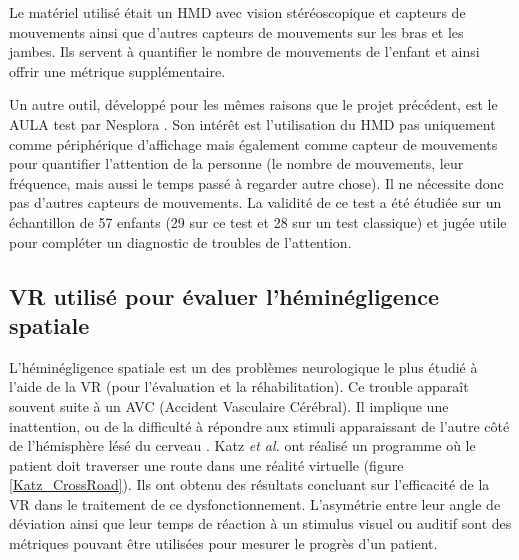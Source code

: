 		\begin{minipage}{\linewidth}
			\label{Rizzo_VirtualClassroom}
		\end{minipage}\medskip

		Le matériel utilisé était un HMD avec vision stéréoscopique et capteurs de mouvements ainsi que d'autres capteurs de mouvements sur les bras et les jambes. Ils servent à quantifier le nombre de mouvements de l'enfant et ainsi offrir une métrique supplémentaire.
		
		Un autre outil, développé pour les mêmes raisons que le projet précédent, est le AULA test par Nesplora \cite{Diaz_AulaVRTest}. 
		Son intérêt est l'utilisation du HMD pas uniquement comme périphérique d'affichage mais également comme capteur de mouvements pour quantifier l'attention de la personne (le nombre de mouvements, leur fréquence, mais aussi le temps passé à regarder autre chose). Il ne nécessite donc pas d'autres capteurs de mouvements. La validité de ce test a été étudiée sur un échantillon de 57 enfants (29 sur ce test et 28 sur un test classique) et jugée utile pour compléter un diagnostic de troubles de l'attention.

	\subsection*{VR utilisé pour évaluer l'héminégligence spatiale}

		L'héminégligence spatiale est un des problèmes neurologique le plus étudié à l'aide de la VR (pour l'évaluation et la réhabilitation). Ce trouble apparaît souvent suite à un AVC (Accident Vasculaire Cérébral). Il implique une inattention, ou de la difficulté à répondre aux stimuli apparaissant de l'autre côté de l'hémisphère lésé du cerveau \cite{VARSG4HC1}.
		Katz \textit{et al.} \cite{Katz_CrossStreet} ont réalisé un programme où le patient doit traverser une route dans une réalité virtuelle (figure \ref{Katz_CrossRoad}). Ils ont obtenu des résultats concluant sur l'efficacité de la VR dans le traitement de ce dysfonctionnement. L'asymétrie entre leur angle de déviation ainsi que leur temps de réaction à un stimulus visuel ou auditif sont des métriques pouvant être utilisées pour mesurer le progrès d'un patient.
		
